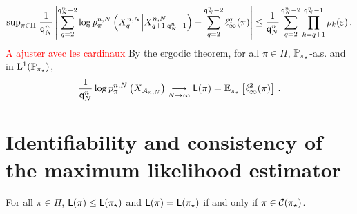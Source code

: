 \[
\mathrm{sup}_{\pi\in\Pi}\;\frac{1}{{\mathsf{q}}^{n}_{N}}\left|\sum_{q=2}^{{\mathsf{q}}^{n}_{N}-2}  \log p_{\pi}^{n,N}\left(X_{q}^{n,N}\middle|X_{q+1:{\mathsf{q}}^{n}_{N}-1}^{n,N}\right) - \sum_{q=2}^{{\mathsf{q}}^{n}_{N}-2}\ell^q_{\infty}(\pi)\right| \le \frac{1}{{\mathsf{q}}^{n}_{N}}\sum_{q=2}^{{\mathsf{q}}^{n}_{N}-2}\prod_{k=q+1}^{{\mathsf{q}}^{n}_{N}-1}\rho_k(\varepsilon)\,.
\]
\textcolor{red}{A ajuster avec les cardinaux}
By the ergodic theorem, for all $\pi\in\Pi$, $\mathbb{P}_{\pi_{\star}}$-a.s.  and in $\mathrm{L}^1(\mathbb{P}_{\pi_{\star}})$,
\[
\frac{1}{{\mathsf{q}}^{n}_{N}}\log p_{\pi}^{n,N}\left(X_{\mathcal{A}_{n,N}}\right) \underset{N\to \infty}{\longrightarrow} \mathsf{L}(\pi) = \mathbb{E}_{\pi_{\star}}\left[\ell^2_{\infty}(\pi)\right]\,.
\]

\section{Identifiability and consistency of the maximum likelihood estimator}

\begin{proposition}
\label{prop:max:likelihood}
For all $\pi\in\Pi$, $\mathsf{L}(\pi)\le \mathsf{L}(\pi_{\star})$ and $\mathsf{L}(\pi) = \mathsf{L}(\pi_{\star})$ if and only if $\pi\in \mathcal{C}(\pi_{\star})$.
\end{proposition}

